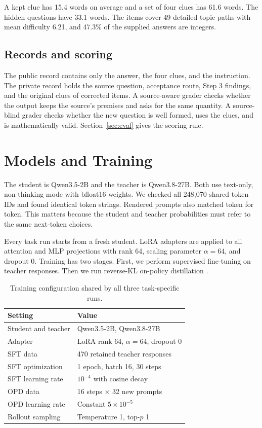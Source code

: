 \documentclass[11pt]{article}
\begin{document}
A kept clue has 15.4 words on average and a set of four clues has 61.6 words. The hidden questions have 33.1 words. The items cover 49 detailed topic paths with mean difficulty 6.21, and 47.3\% of the supplied answers are integers.

\subsection{Records and scoring}

The public record contains only the answer, the four clues, and the instruction. The private record holds the source question, acceptance route, Step 3 findings, and the original clues of corrected items. A source-aware grader checks whether the output keeps the source's premises and asks for the same quantity. A source-blind grader checks whether the new question is well formed, uses the clues, and is mathematically valid. Section~\ref{sec:eval} gives the scoring rule.

\section{Models and Training}

The student is Qwen3.5-2B and the teacher is Qwen3.8-27B. Both use text-only, non-thinking mode with bfloat16 weights. We checked all 248,070 shared token IDs and found identical token strings. Rendered prompts also matched token for token. This matters because the student and teacher probabilities must refer to the same next-token choices.

Every task run starts from a fresh student. LoRA adapters are applied to all attention and MLP projections with rank 64, scaling parameter $\alpha=64$, and dropout 0. Training has two stages. First, we perform supervised fine-tuning on teacher responses. Then we run reverse-KL on-policy distillation \citep{agarwal2024opd}.

\begin{table}[t]
\centering
\small
\setlength{\tabcolsep}{4pt}
\begin{tabular}{ll}
\toprule
Setting & Value \\
\midrule
Student and teacher & Qwen3.5-2B, Qwen3.8-27B \\
Adapter & LoRA rank 64, $\alpha=64$, dropout 0 \\
SFT data & 470 retained teacher responses \\
SFT optimization & 1 epoch, batch 16, 30 steps \\
SFT learning rate & $10^{-4}$ with cosine decay \\
OPD data & 16 steps $\times$ 32 new prompts \\
OPD learning rate & Constant $5\times10^{-5}$ \\
Rollout sampling & Temperature 1, top-$p$ 1 \\
\bottomrule
\end{tabular}
\caption{Training configuration shared by all three task-specific runs.}
\label{tab:training-settings}
\end{table}
\end{document}
